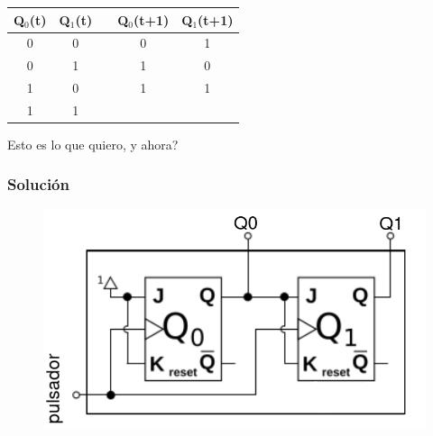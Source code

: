 \documentclass[10pt]{beamer}
\begin{document}
\begin{frame}
{\begin{table}[h!]
\begin{tabular}{|c|c|c|c|c|}
\hline
Q$_0$(t) & Q$_1$(t) &  & Q$_0$(t+1) & Q$_1$(t+1) \\ \hline
0        & 0        &  & 0          & 1          \\ \hline
0        & 1        &  & 1          & 0          \\ \hline
1        & 0        &  & 1          & 1          \\ \hline
1        & 1        &  &           &           \\ \hline
\end{tabular}
\end{table}}
Esto es lo que quiero, y ahora?
\end{frame}


\begin{frame}
\frametitle{Solución}

\begin{figure}[h!]
    \centering
    \includegraphics[scale=0.2]{circuito.png}
\end{figure}
\end{frame}
\end{document}
